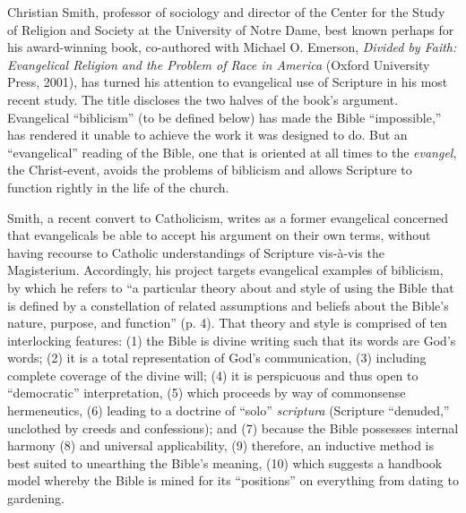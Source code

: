 

\def\myauthor{Wesley A. Hill}
\def\institution{Durham University, UK}
\def\authoremail{w.a.hill@durham.ac.uk}
\def\bookauthor{Christian Smith}
\def\booktitle{The Bible Made Impossible: Why Biblicism is Not a Truly Evangelical Reading of Scripture}
\def\shorttitle{The Bible Made Impossible}
\def\bookpublication{Grand Rapids, Michigan: Brazos Press, 2011. Pp. xiv + 220. Hardcover. \$22.99.}
\def\keywords{evangelicalism, Catholicism, hermeneutics}
\def\datesubmitted{30 July 2011}
\def\dateaccepted{25 October 2011}
\def\datepublished{26 October 2011}
\def\jstyear{2011}
\def\jstvol{1}
\def\jstiss{1}
\def\firstpage{501}

Christian Smith, professor of sociology and director of the Center for
the Study of Religion and Society at the University of Notre Dame, best
known perhaps for his award-winning book, co-authored with Michael O.
Emerson, \emph{Divided by Faith: Evangelical Religion and the Problem of Race
in America} (Oxford University Press, 2001), has turned his attention to
evangelical use of Scripture in his most recent study. The title
discloses the two halves of the book’s argument. Evangelical “biblicism”
(to be defined below) has made the Bible “impossible,” has rendered it
unable to achieve the work it was designed to do. But an “evangelical”
reading of the Bible, one that is oriented at all times to the
\emph{evangel}, the Christ-event, avoids the problems of biblicism and allows
Scripture to function rightly in the life of the church.

Smith, a recent convert to Catholicism, writes as a former evangelical
concerned that evangelicals be able to accept his argument on their own
terms, without having recourse to Catholic understandings of Scripture
vis-à-vis the Magisterium. Accordingly, his project targets evangelical
examples of biblicism, by which he refers to “a particular theory about
and style of using the Bible that is defined by a constellation of
related assumptions and beliefs about the Bible’s nature, purpose, and
function” (p. 4). That theory and style is comprised of ten interlocking
features: (1) the Bible is divine writing such that its words are God’s
words; (2) it is a total representation of God’s communication, (3)
including complete coverage of the divine will; (4) it is perspicuous
and thus open to “democratic” interpretation, (5) which proceeds by way
of commonsense hermeneutics, (6) leading to a doctrine of “solo”
\emph{scriptura} (Scripture “denuded,” unclothed by creeds and confessions);
and (7) because the Bible possesses internal harmony (8) and universal
applicability, (9) therefore, an inductive method is best suited to
unearthing the Bible’s meaning, (10) which suggests a handbook model
whereby the Bible is mined for its “positions” on everything from dating
to gardening.

